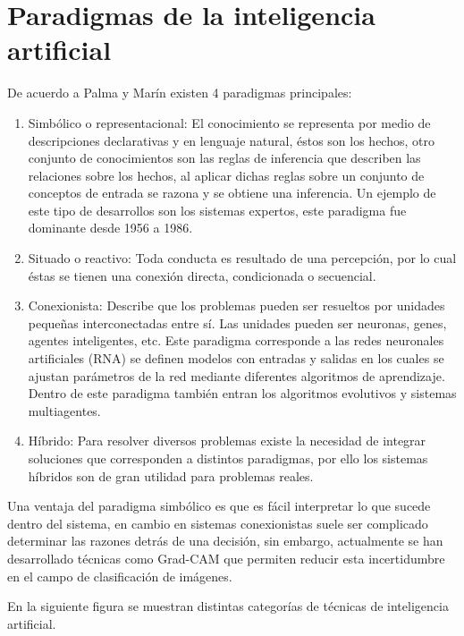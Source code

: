\documentclass[11pt,fleqn]{book} %
\begin{document}
\section{Paradigmas de la inteligencia artificial} 

De acuerdo a Palma y Marín \cite{marin2008inteligencia} existen 4 paradigmas principales:
\begin{enumerate}
\item Simbólico o representacional: El conocimiento se representa por medio de descripciones declarativas y en lenguaje natural, éstos son los hechos, otro conjunto de conocimientos son las reglas de inferencia que describen las relaciones sobre los hechos, al aplicar dichas reglas sobre un conjunto de conceptos de entrada se razona y se obtiene una inferencia.
Un ejemplo de este tipo de desarrollos son los sistemas expertos, este paradigma fue dominante desde 1956 a 1986.

\item Situado o reactivo: Toda conducta es resultado de una percepción, por lo cual éstas se tienen una conexión directa, condicionada o secuencial.

\item Conexionista: Describe que los problemas pueden ser resueltos por unidades pequeñas interconectadas entre sí. Las unidades pueden ser neuronas, genes, agentes inteligentes, etc. Este paradigma corresponde a las redes neuronales artificiales (RNA) se definen modelos con entradas y salidas en los cuales se ajustan parámetros de la red mediante diferentes algoritmos de aprendizaje. Dentro de este paradigma también entran los algoritmos evolutivos y sistemas multiagentes.

\item Híbrido: Para resolver diversos problemas existe la necesidad de integrar soluciones que corresponden a distintos paradigmas, por ello los sistemas híbridos son de gran utilidad para problemas reales.
\end{enumerate}

Una ventaja del paradigma simbólico es que es fácil interpretar lo que sucede dentro del sistema, en cambio en sistemas conexionistas suele ser complicado determinar las razones detrás de una decisión, sin embargo, actualmente se han desarrollado técnicas como Grad-CAM \cite{gradcam} que permiten reducir esta incertidumbre en el campo de clasificación de imágenes.

En la siguiente figura se muestran distintas categorías de técnicas de inteligencia artificial.
\end{document}
